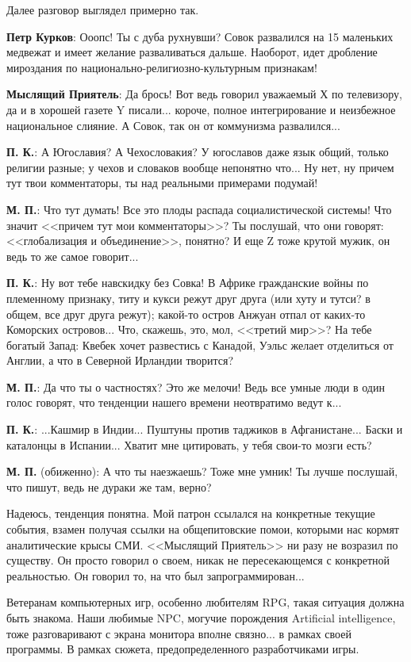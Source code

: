 \documentclass{scrbook}
\newcommand{\flqq}{<<}
\newcommand{\frqq}{>>}
\begin{document}
Далее разговор выглядел примерно так.

\textbf{Петр Курков}: Ооопс! Ты с дуба рухнувши? Совок развалился на 15 маленьких медвежат и имеет желание разваливаться дальше. Наоборот, идет дробление мироздания по национально-религиозно-культурным признакам!

\textbf{Мыслящий Приятель}: Да брось! Вот ведь говорил уважаемый Х по телевизору, да и в хорошей газете Y писали... короче, полное интегрирование и неизбежное национальное слияние. А Совок, так он от коммунизма развалился...

\textbf{П. К.}: А Югославия? А Чехословакия? У югославов даже язык общий, только религии разные; у чехов и словаков вообще непонятно что... Ну нет, ну причем тут твои комментаторы, ты над реальными примерами подумай!

\textbf{М. П.}: Что тут думать! Все это плоды распада социалистической системы! Что значит {\flqq}причем тут мои комментаторы{\frqq}? Ты послушай, что они говорят: {\flqq}глобализация и объединение{\frqq}, понятно? И еще Z тоже крутой мужик, он ведь то же самое говорит...

\textbf{П. К.}: Ну вот тебе навскидку без Совка! В Африке гражданские войны по племенному признаку, титу и кукси режут друг друга (или хуту и тутси? в общем, все друг друга режут); какой-то остров Анжуан отпал от каких-то Коморских островов... Что, скажешь, это, мол, {\flqq}третий мир{\frqq}? На тебе богатый Запад: Квебек хочет развестись с Канадой, Уэльс желает отделиться от Англии, а что в Северной Ирландии творится?

\textbf{М. П.}: Да что ты о частностях? Это же мелочи! Ведь все умные люди в один голос говорят, что тенденции нашего времени неотвратимо ведут к...

\textbf{П. К.}: ...Кашмир в Индии... Пуштуны против таджиков в Афганистане... Баски и каталонцы в Испании... Хватит мне цитировать, у тебя свои-то мозги есть?

\textbf{М. П.} (обиженно): А что ты наезжаешь? Тоже мне умник! Ты лучше послушай, что пишут, ведь не дураки же там, верно?

Надеюсь, тенденция понятна. Мой патрон ссылался на конкретные текущие события, взамен получая ссылки на общепитовские помои, которыми нас кормят аналитические крысы СМИ. {\flqq}Мыслящий Приятель{\frqq} ни разу не возразил по существу. Он просто говорил о своем, никак не пересекающемся с конкретной реальностью. Он говорил то, на что был запрограммирован...

Ветеранам компьютерных игр, особенно любителям RPG, такая ситуация должна быть знакома. Наши любимые NPC, могучие порождения Artificial intelligence, тоже разговаривают с экрана монитора вполне связно... в рамках своей программы. В рамках сюжета, предопределенного разработчиками игры.
\end{document}
